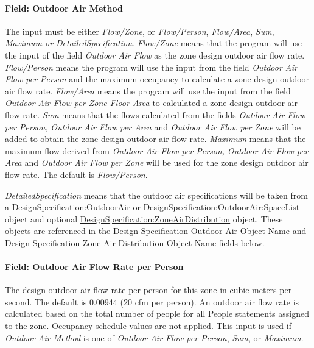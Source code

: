 \paragraph{Field: Outdoor Air Method}\label{field-outdoor-air-method-2}

The input must be either \emph{Flow/Zone}, or \emph{Flow/Person}, \emph{Flow/Area}, \emph{Sum}, \emph{Maximum or DetailedSpecification}. \emph{Flow/Zone} means that the program will use the input of the field \emph{Outdoor Air Flow} as the zone design outdoor air flow rate. \emph{Flow/Person} means the program will use the input from the field \emph{Outdoor Air Flow per Person} and the maximum occupancy to calculate a zone design outdoor air flow rate. \emph{Flow/Area} means the program will use the input from the field \emph{Outdoor Air Flow per Zone Floor Area} to calculated a zone design outdoor air flow rate. \emph{Sum} means that the flows calculated from the fields \emph{Outdoor Air Flow per Person,} \emph{Outdoor Air Flow per Area} and \emph{Outdoor Air Flow per Zone} will be added to obtain the zone design outdoor air flow rate. \emph{Maximum} means that the maximum flow derived from \emph{Outdoor Air Flow per Person,} \emph{Outdoor Air Flow per Area} and \emph{Outdoor Air Flow per Zone} will be used for the zone design outdoor air flow rate. The default is \emph{Flow/Person}.

\emph{DetailedSpecification} means that the outdoor air specifications will be taken from a \hyperref[designspecificationoutdoorair]{DesignSpecification:OutdoorAir} or \hyperref[designspecificationoutdoorairspacelist]{DesignSpecification:OutdoorAir:SpaceList} object and optional \hyperref[designspecificationzoneairdistribution]{DesignSpecification:ZoneAirDistribution} object. These objects are referenced in the Design Specification Outdoor Air Object Name and Design Specification Zone Air Distribution Object Name fields below.

\paragraph{Field: Outdoor Air Flow Rate per Person}\label{field-outdoor-air-flow-rate-per-person-2}

The design outdoor air flow rate per person for this zone in cubic meters per second. The default is 0.00944 (20 cfm per person). An outdoor air flow rate is calculated based on the total number of people for all \hyperref[people]{People} statements assigned to the zone. Occupancy schedule values are not applied. This input is used if \emph{Outdoor Air Method} is one of \emph{Outdoor Air Flow per Person}, \emph{Sum}, or \emph{Maximum}.


